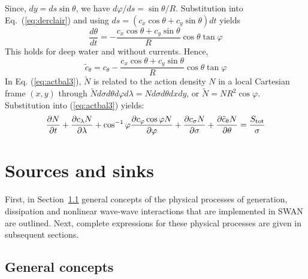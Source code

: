 \documentclass[12pt]{book}
\begin{document}
Since, $dy = ds \sin \theta$, we have $d\varphi/ds = \sin\theta/R$. Substitution into Eq.~(\ref{eq:derclair}) and using
$ds=(c_x \cos \theta + c_y \sin \theta)dt$ yields
\begin{equation}
  \frac{d\theta}{dt} = -\frac{c_x \cos \theta + c_y \sin \theta}{R} \cos \theta \tan \varphi
\end{equation}
This holds for deep water and without currents. Hence,
\begin{equation}
  \tilde{c}_\theta = c_\theta - \frac{c_x \cos \theta + c_y \sin \theta}{R} \cos \theta \tan \varphi
\end{equation}
In Eq. (\ref{eq:actbal3}),
$\tilde{N}$ is related to the action density $N$ in a local Cartesian frame $(x,y)$ through
$\tilde{N} d\sigma d\theta d\varphi d\lambda = N d\sigma d\theta dx dy$, or $\tilde{N} = NR^2 \cos \varphi$.
Substitution into (\ref{eq:actbal3}) yields:
\begin{equation}
  \frac{\partial N}{\partial t} + \frac{\partial c_\lambda N}{\partial \lambda} + \cos^{-1} \varphi
  \frac{\partial c_\varphi \cos \varphi N}{\partial \varphi} +
  \frac{\partial c_\sigma N}{\partial \sigma} + \frac{\partial \tilde{c}_\theta N}{\partial \theta} =
  \frac{S_{\rm tot}}{\sigma}
  \label{eq:actbal4}
\end{equation}

\section{Sources and sinks} \label{sec:soursnk}

First, in Section~\ref{sec:gencon} general concepts of the physical processes of generation, dissipation and
nonlinear wave-wave interactions that are implemented in SWAN are outlined. Next, complete expressions for
these physical processes are given in subsequent sections.

\subsection{General concepts} \label{sec:gencon}
\end{document}
